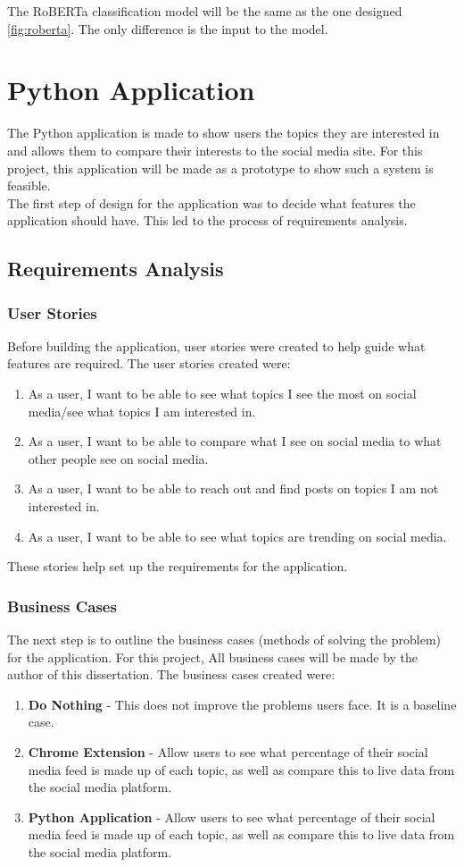 The RoBERTa classification model will be the same as the one designed \cref{fig:roberta}. The only difference is the input
to the model.
\section{Python Application}
The Python application is made to show users the topics they are interested in and allows them to compare their interests to the 
social media site. For this project, this application will be made as a prototype to show such a system is feasible.\\
The first step of design for the application was to decide what features the application should have. This led to the process of
requirements analysis.\\
\subsection{Requirements Analysis}
\subsubsection{User Stories}
Before building the application, user stories were created to help guide what features are required. The user stories created were:
\begin{enumerate}
    \item As a user, I want to be able to see what topics I see the most on social media/see what topics I am interested in.
    \item As a user, I want to be able to compare what I see on social media to what other people see on social media.
    \item As a user, I want to be able to reach out and find posts on topics I am not interested in.
    \item As a user, I want to be able to see what topics are trending on social media.
\end{enumerate}
These stories help set up the requirements for the application.
\subsubsection{Business Cases}
The next step is to outline the business cases (methods of solving the problem) for the application. For this project,
All business cases will be made by the author of this dissertation. The business cases created were:
\begin{enumerate}
    \item \textbf{Do Nothing} - This does not improve the problems users face. It is a baseline case.
    \item \textbf{Chrome Extension} - Allow users to see what percentage of their social media feed is made up of each topic, as well as compare this to live data from the social media platform.
    \item \textbf{Python Application} - Allow users to see what percentage of their social media feed is made up of each topic, as well as compare this to live data from the social media platform.
\end{enumerate}

